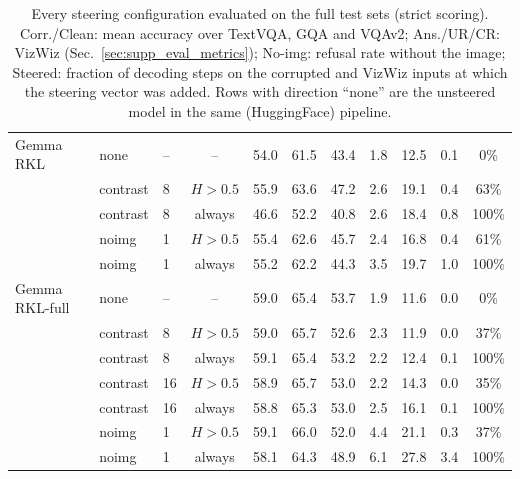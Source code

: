 \begin{table}[p]
\begin{tabular}{lllcccccccc}
\midrule
Gemma RKL & none & -- & -- & 54.0 & 61.5 & 43.4 & 1.8 & 12.5 & 0.1 & 0\% \\
 & contrast & 8 & $H{>}0.5$ & 55.9 & 63.6 & 47.2 & 2.6 & 19.1 & 0.4 & 63\% \\
 & contrast & 8 & always & 46.6 & 52.2 & 40.8 & 2.6 & 18.4 & 0.8 & 100\% \\
 & noimg & 1 & $H{>}0.5$ & 55.4 & 62.6 & 45.7 & 2.4 & 16.8 & 0.4 & 61\% \\
 & noimg & 1 & always & 55.2 & 62.2 & 44.3 & 3.5 & 19.7 & 1.0 & 100\% \\
\midrule
Gemma RKL-full & none & -- & -- & 59.0 & 65.4 & 53.7 & 1.9 & 11.6 & 0.0 & 0\% \\
 & contrast & 8 & $H{>}0.5$ & 59.0 & 65.7 & 52.6 & 2.3 & 11.9 & 0.0 & 37\% \\
 & contrast & 8 & always & 59.1 & 65.4 & 53.2 & 2.2 & 12.4 & 0.1 & 100\% \\
 & contrast & 16 & $H{>}0.5$ & 58.9 & 65.7 & 53.0 & 2.2 & 14.3 & 0.0 & 35\% \\
 & contrast & 16 & always & 58.8 & 65.3 & 53.0 & 2.5 & 16.1 & 0.1 & 100\% \\
 & noimg & 1 & $H{>}0.5$ & 59.1 & 66.0 & 52.0 & 4.4 & 21.1 & 0.3 & 37\% \\
 & noimg & 1 & always & 58.1 & 64.3 & 48.9 & 6.1 & 27.8 & 3.4 & 100\% \\
\bottomrule
\end{tabular}
\caption{Every steering configuration evaluated on the full test sets (strict scoring). Corr./Clean: mean accuracy over TextVQA, GQA and VQAv2; Ans./UR/CR: VizWiz (Sec.~\ref{sec:supp_eval_metrics}); No-img: refusal rate without the image; Steered: fraction of decoding steps on the corrupted and VizWiz inputs at which the steering vector was added. Rows with direction ``none'' are the unsteered model in the same (HuggingFace) pipeline.}
\label{tab:supp_steer_test}
\end{table}

